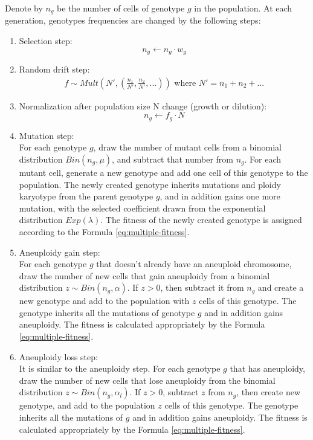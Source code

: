 \documentclass[12pt]{extarticle}
\begin{document}
Denote by $n_g$ be the number of cells of genotype $g$ in the population. At each generation, genotypes frequencies are changed by the following steps:
\begin{enumerate}
	\item Selection step: 
	\begin{equation} \label{eq:multiple-selection} 
		n_g\gets{n_g\cdot{w_g}}
	\end{equation}
	\item Random drift step:
	\begin{equation} \label{eq:multiple-rand-drift} \begin{aligned}
			f \sim Mult(N', (\frac{n_1}{N'},\frac{n_2}{N'},...)) \text{ where } N'=n_1+n_2+... 
		\end{aligned}
	\end{equation}
	\item Normalization after population size N change (growth or dilution):
	\begin{equation} \label{eq:multiple-pop-size} 
		n_g\gets{f_g\cdot{N}}
	\end{equation}
	\item Mutation step: \\
	For each genotype $g$, draw the number of mutant cells from a binomial distribution $Bin(n_g, \mu)$, and subtract that number from $n_g$. For each mutant cell, generate a new genotype and add one cell of this genotype to the population. The newly created genotype inherits mutations and ploidy karyotype from the parent genotype $g$, and in addition gains one more mutation, with the selected coefficient drawn from the exponential distribution $Exp(\lambda)$. The fitness of the newly created genotype is assigned according to the Formula \ref{eq:multiple-fitness}.
	\item Aneuploidy gain step: \\
	For each genotype $g$ that doesn’t already have an aneuploid chromosome, draw the number of new cells that gain aneuploidy from a binomial distribution $z \sim Bin(n_g, \alpha)$. If $z > 0$, then subtract it from $n_g$ and create a new genotype and add to the population with $z$ cells of this genotype. The genotype inherits all the mutations of genotype $g$ and in addition gains aneuploidy. The fitness is calculated appropriately by the Formula \ref{eq:multiple-fitness}.
	\item Aneuploidy loss step: \\
	It is similar to the aneuploidy step. For each genotype $g$ that has aneuploidy, draw the number of new cells that lose aneuploidy from the binomial distribution $z \sim Bin(n_g,\alpha_l)$. If $z>0$, subtract $z$ from $n_g$, then create new genotype, and add to the population $z$ cells of this genotype. The genotype inherits all the mutations of $g$ and in addition gains aneuploidy. The fitness is calculated appropriately by the Formula \ref{eq:multiple-fitness}.
\end{enumerate}
\end{document}
